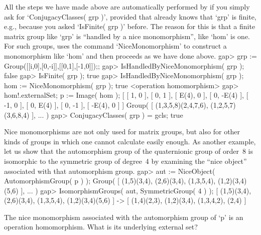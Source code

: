 All the steps we have made above are automatically performed by {\GAP} if
you  simply   ask for `ConjugacyClasses(  grp  )',   provided that {\GAP}
already knows that  `grp' is finite,  e.g., because you asked  `IsFinite(
grp )'  before. The reason  for this is that a   finite matrix group like
`grp' is ``handled by a nice monomorphism'',  like `hom' is one. For such
groups,  {\GAP} uses  the command   `NiceMonomorphism'   to construct   a
monomorphism like `hom' and then proceeds as we have done above.
\beginexample
    gap> grp := Group([[i,0],[0,-i]],[[0,1],[-1,0]]);;
    gap> IsHandledByNiceMonomorphism( grp );
    false
    gap> IsFinite( grp );
    true
    gap> IsHandledByNiceMonomorphism( grp ); hom := NiceMonomorphism( grp );
    true
    <operation homomorphism>
    gap> hom!.externalSet; p := Image( hom );
    [ [ 1, 0 ], [ 0, 1 ], [ E(4), 0 ], [ 0, -E(4) ], [ -1, 0 ], [ 0, E(4) ], 
      [ 0, -1 ], [ -E(4), 0 ] ]
    Group( [ (1,3,5,8)(2,4,7,6), (1,2,5,7)(3,6,8,4) ], ... )
    gap> ConjugacyClasses( grp ) = gcls;
    true
\endexample

Nice monomorphisms are   not only used  for matrix  groups, but  also for
other kinds of  groups  in which  one cannot calculate  easily enough. As
another   example, let  us    show that the   automorphism  group  of the
quaternionic  group of  order~8 is isomorphic  to  the symmetric group of
degree~4   by   examining  the ``nice   object''    associated with  that
automorphism group.
\beginexample
    gap> aut := NiceObject( AutomorphismGroup( p ) );
    Group( [ (1,5)(3,4), (2,6)(3,4), (1,3,5,4), (1,2)(3,4)(5,6) ], ... )
    gap> IsomorphismGroups( aut, SymmetricGroup( 4 ) );
    [ (1,5)(3,4), (2,6)(3,4), (1,3,5,4), (1,2)(3,4)(5,6) ] -> 
    [ (1,4)(2,3), (1,2)(3,4), (1,3,4,2), (2,4) ]
\endexample

\exercise The nice monomorphism associated with the automorphism group of
`p' is an operation homomorphism. What is its underlying external set?


